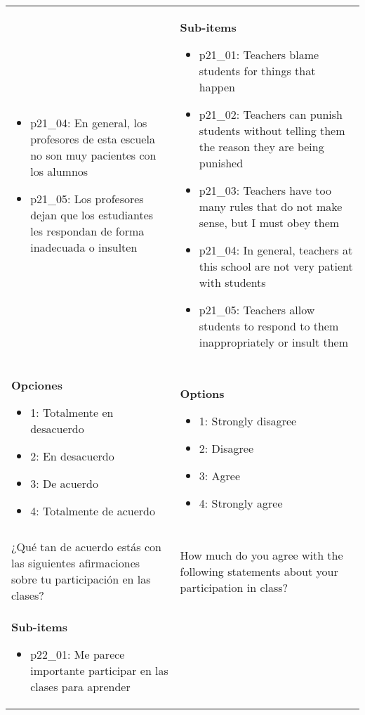 \documentclass[11pt]{article}
\begin{document}
\begin{longtable}{@{}LL@{}}
\begin{itemize}[leftmargin=*]
\item p21\_04: En general, los profesores de esta escuela no son muy pacientes con los alumnos
\item p21\_05: Los profesores dejan que los estudiantes les respondan de forma inadecuada o insulten\end{itemize} & \textbf{Sub-items}\par\begin{itemize}[leftmargin=*]\item p21\_01: Teachers blame students for things that happen
\item p21\_02: Teachers can punish students without telling them the reason they are being punished
\item p21\_03: Teachers have too many rules that do not make sense, but I must obey them
\item p21\_04: In general, teachers at this school are not very patient with students
\item p21\_05: Teachers allow students to respond to them inappropriately or insult them\end{itemize} \\
\textbf{Opciones}\par\begin{itemize}[leftmargin=*]\item 1: Totalmente en desacuerdo
\item 2: En desacuerdo
\item 3: De acuerdo
\item 4: Totalmente de acuerdo\end{itemize} & \textbf{Options}\par\begin{itemize}[leftmargin=*]\item 1: Strongly disagree
\item 2: Disagree
\item 3: Agree
\item 4: Strongly agree\end{itemize} \\
\addlinespace[4pt]
 \\ 
¿Qué tan de acuerdo estás con las siguientes afirmaciones sobre tu participación en las clases? & How much do you agree with the following statements about your participation in class? \\
\textbf{Sub-items}\par\begin{itemize}[leftmargin=*]\item p22\_01: Me parece importante participar en las clases para aprender

\end{itemize}
\end{longtable}
\end{document}
